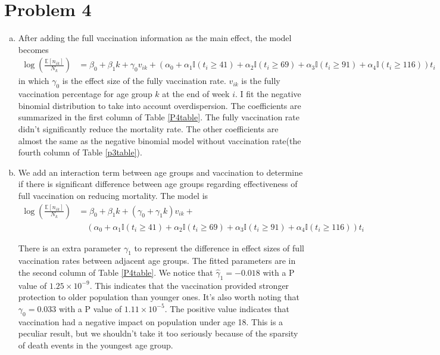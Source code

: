 \documentclass[12pt]{article}
\begin{document}
\section*{Problem 4}

\begin{enumerate}[(a)]
	\item After adding the full vaccination information as the main effect, the model becomes
	\begin{align*}
		\log(\frac{\mathbb{E}[n_{ik}]}{N_{k}}) &= \beta_{0} + \beta_{1}k +\gamma_{0} v_{ik} + \left(\alpha_{0} + \alpha_{1}\mathbb{I}(t_{i} \geq 41) + \alpha_{2}\mathbb{I}(t_{i} \geq 69) +\alpha_{3} \mathbb{I}(t_{i} \geq 91) + \alpha_{4}\mathbb{I}(t_{i} \geq 116)\right) t_{i} 
	\end{align*}
	in which $\gamma_{0}$ is the effect size of the fully vaccination rate. $v_{ik}$ is the fully vaccination percentage for age group $k$ at the end of week $i$. I fit the negative binomial distribution to take into account overdispersion. The coefficients are summarized in the first column of Table \ref{P4table}. The fully vaccination rate didn't significantly reduce the mortality rate. The other coefficients are almost the same as the negative binomial model without vaccination rate(the fourth column of Table \ref{p3table}).
	
	
	\item We add an interaction term between age groups and vaccination to determine if there is significant difference between age groups regarding effectiveness of full vaccination on reducing mortality. The model is
		\begin{align*}
		\log(\frac{\mathbb{E}[n_{ik}]}{N_{k}}) &= \beta_{0} + \beta_{1}k +(\gamma_{0} + \gamma_{1}k) v_{ik} +\\ 
		&\quad \left(\alpha_{0} + \alpha_{1}\mathbb{I}(t_{i} \geq 41) + \alpha_{2}\mathbb{I}(t_{i} \geq 69) +\alpha_{3} \mathbb{I}(t_{i} \geq 91) + \alpha_{4}\mathbb{I}(t_{i} \geq 116)\right) t_{i}
	\end{align*}
	
	There is an extra parameter $\gamma_{1}$ to represent the difference in effect sizes of full vaccination rates between adjacent age groups. The fitted parameters are in the second column of Table \ref{P4table}. We notice that $\hat{\gamma}_{1} = -0.018$ with a P value of $1.25\times 10^{-9}$. This indicates that the vaccination provided stronger protection to older population than younger ones. It's also worth noting that $\gamma_{0}=0.033$ with a P value of $1.11\times 10^{-5}$. The positive value indicates that vaccination had a negative impact on population under age 18. This is a peculiar result, but we shouldn't take it too seriously because of the sparsity of death events in the youngest age group.
	

\end{enumerate}
\end{document}
